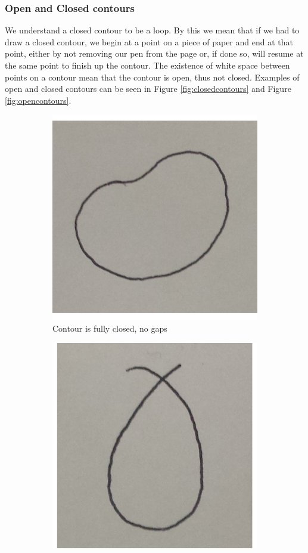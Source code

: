\documentclass[11pt]{article}
\begin{document}
\subsubsection{Open and Closed contours}
We understand a closed contour to be a loop. By this we mean that if we had
to draw a closed contour, we begin at a point on a piece of paper and end at that
point, either by not removing our pen from the page or, if done so, will resume
at the same point to finish up the contour. The existence of white space between
points on a contour mean that the contour is open, thus not closed. Examples
of open and closed contours can be seen in Figure \ref{fig:closedcontours} and 
Figure \ref{fig:opencontours}.
\\

\begin{figure}[!ht]
	\centering
	\begin{subfigure}[t]{.3\textwidth}
		\centering
		\includegraphics[scale=0.3]{pics/closedloop1.png}
		\caption{Contour is fully closed, no gaps}
	\end{subfigure}
	\hfill
	\begin{subfigure}[t]{.3\textwidth}
		\centering
		\includegraphics[scale=0.3]{pics/closedloop2.png}

\end{subfigure}
\end{figure}
\end{document}

